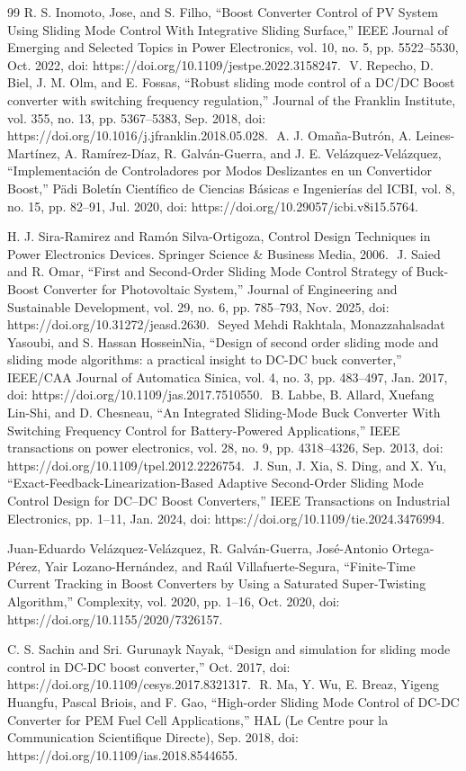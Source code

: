\documentclass[12pt,oneside,openany]{book}
\begin{document}
\begin{thebibliography}{99}
R. S. Inomoto, Jose, and S. Filho, “Boost Converter Control of PV System Using Sliding Mode Control With Integrative Sliding Surface,” IEEE Journal of Emerging and Selected Topics in Power Electronics, vol. 10, no. 5, pp. 5522–5530, Oct. 2022, doi: https://doi.org/10.1109/jestpe.2022.3158247.
‌
V. Repecho, D. Biel, J. M. Olm, and E. Fossas, “Robust sliding mode control of a DC/DC Boost converter with switching frequency regulation,” Journal of the Franklin Institute, vol. 355, no. 13, pp. 5367–5383, Sep. 2018, doi: https://doi.org/10.1016/j.jfranklin.2018.05.028.
‌
A. J. Omaña-Butrón, A. Leines-Martínez, A. Ramírez-Díaz, R. Galván-Guerra, and J. E. Velázquez-Velázquez, “Implementación de Controladores por Modos Deslizantes en un Convertidor Boost,” Pädi Boletín Científico de Ciencias Básicas e Ingenierías del ICBI, vol. 8, no. 15, pp. 82–91, Jul. 2020, doi: https://doi.org/10.29057/icbi.v8i15.5764.

H. J. Sira-Ramirez and Ramón Silva-Ortigoza, Control Design Techniques in Power Electronics Devices. Springer Science \&	 Business Media, 2006.
 ‌
 J. Saied and R. Omar, “First and Second-Order Sliding Mode Control Strategy of Buck-Boost Converter for Photovoltaic System,” Journal of Engineering and Sustainable Development, vol. 29, no. 6, pp. 785–793, Nov. 2025, doi: https://doi.org/10.31272/jeasd.2630.
 ‌
Seyed Mehdi Rakhtala, Monazzahalsadat Yasoubi, and S. Hassan HosseinNia, “Design of second order sliding mode and sliding mode algorithms: a practical insight to DC-DC buck converter,” IEEE/CAA Journal of Automatica Sinica, vol. 4, no. 3, pp. 483–497, Jan. 2017, doi: https://doi.org/10.1109/jas.2017.7510550.
‌%
B. Labbe, B. Allard, Xuefang Lin-Shi, and D. Chesneau, “An Integrated Sliding-Mode Buck Converter With Switching Frequency Control for Battery-Powered Applications,” IEEE transactions on power electronics, vol. 28, no. 9, pp. 4318–4326, Sep. 2013, doi: https://doi.org/10.1109/tpel.2012.2226754.
‌%
J. Sun, J. Xia, S. Ding, and X. Yu, “Exact-Feedback-Linearization-Based Adaptive Second-Order Sliding Mode Control Design for DC–DC Boost Converters,” IEEE Transactions on Industrial Electronics, pp. 1–11, Jan. 2024, doi: https://doi.org/10.1109/tie.2024.3476994.

Juan-Eduardo Velázquez-Velázquez, R. Galván-Guerra, José-Antonio Ortega-Pérez, Yair Lozano-Hernández, and Raúl Villafuerte-Segura, “Finite-Time Current Tracking in Boost Converters by Using a Saturated Super-Twisting Algorithm,” Complexity, vol. 2020, pp. 1–16, Oct. 2020, doi: https://doi.org/10.1155/2020/7326157.

C. S. Sachin and Sri. Gurunayk Nayak, “Design and simulation for sliding mode control in DC-DC boost converter,” Oct. 2017, doi: https://doi.org/10.1109/cesys.2017.8321317.
‌%
R. Ma, Y. Wu, E. Breaz, Yigeng Huangfu, Pascal Briois, and F. Gao, “High-order Sliding Mode Control of DC-DC Converter for PEM Fuel Cell Applications,” HAL (Le Centre pour la Communication Scientifique Directe), Sep. 2018, doi: https://doi.org/10.1109/ias.2018.8544655.
‌
\end{thebibliography}
\end{document}

